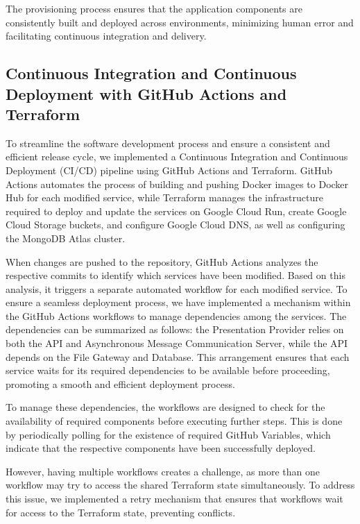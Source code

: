 \documentclass[a4paper,fleqn]{cas-sc}
\begin{document}
The provisioning process ensures that the application components are consistently built and deployed across environments, minimizing human error and facilitating continuous integration and delivery.

\subsection{Continuous Integration and Continuous Deployment with GitHub Actions and Terraform}

To streamline the software development process and ensure a consistent and efficient release cycle, we implemented a Continuous Integration and Continuous Deployment (CI/CD) pipeline using GitHub Actions and Terraform. GitHub Actions automates the process of building and pushing Docker images to Docker Hub for each modified service, while Terraform manages the infrastructure required to deploy and update the services on Google Cloud Run, create Google Cloud Storage buckets, and configure Google Cloud DNS, as well as configuring the MongoDB Atlas cluster.

When changes are pushed to the repository, GitHub Actions analyzes the respective commits to identify which services have been modified. Based on this analysis, it triggers a separate automated workflow for each modified service. To ensure a seamless deployment process, we have implemented a mechanism within the GitHub Actions workflows to manage dependencies among the services. The dependencies can be summarized as follows: the Presentation Provider relies on both the API and Asynchronous Message Communication Server, while the API depends on the File Gateway and Database. This arrangement ensures that each service waits for its required dependencies to be available before proceeding, promoting a smooth and efficient deployment process.

To manage these dependencies, the workflows are designed to check for the availability of required components before executing further steps. This is done by periodically polling for the existence of required GitHub Variables, which indicate that the respective components have been successfully deployed.

However, having multiple workflows creates a challenge, as more than one workflow may try to access the shared Terraform state simultaneously. To address this issue, we implemented a retry mechanism that ensures that workflows wait for access to the Terraform state, preventing conflicts.
\end{document}
